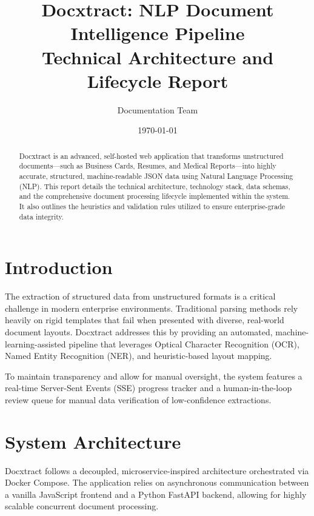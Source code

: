 \documentclass[12pt,a4paper]{article}
\title{\textbf{Docxtract: NLP Document Intelligence Pipeline}\\ \Large Technical Architecture and Lifecycle Report}
\author{Documentation Team}
\date{\today}
\begin{document}
\maketitle

\begin{abstract}
Docxtract is an advanced, self-hosted web application that transforms unstructured documents---such as Business Cards, Resumes, and Medical Reports---into highly accurate, structured, machine-readable JSON data using Natural Language Processing (NLP). This report details the technical architecture, technology stack, data schemas, and the comprehensive document processing lifecycle implemented within the system. It also outlines the heuristics and validation rules utilized to ensure enterprise-grade data integrity.
\end{abstract}

\tableofcontents
\newpage

\section{Introduction}
The extraction of structured data from unstructured formats is a critical challenge in modern enterprise environments. Traditional parsing methods rely heavily on rigid templates that fail when presented with diverse, real-world document layouts. Docxtract addresses this by providing an automated, machine-learning-assisted pipeline that leverages Optical Character Recognition (OCR), Named Entity Recognition (NER), and heuristic-based layout mapping. 

To maintain transparency and allow for manual oversight, the system features a real-time Server-Sent Events (SSE) progress tracker and a human-in-the-loop review queue for manual data verification of low-confidence extractions.

\section{System Architecture}
Docxtract follows a decoupled, microservice-inspired architecture orchestrated via Docker Compose. The application relies on asynchronous communication between a vanilla JavaScript frontend and a Python FastAPI backend, allowing for highly scalable concurrent document processing.
\end{document}

